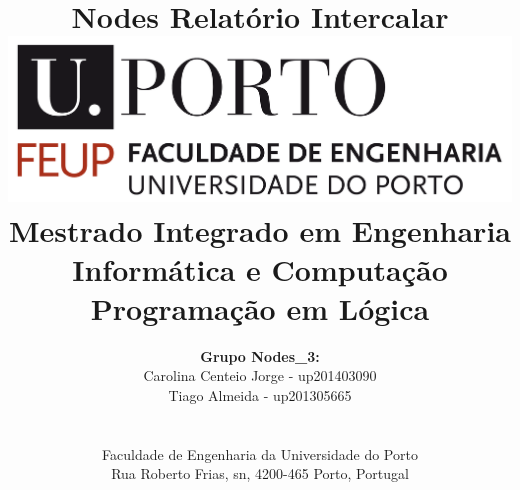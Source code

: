 \documentclass[a4paper]{article}
\begin{document}
\renewcommand{\figurename}{Fig.}

\setlength{\textwidth}{16cm}
\setlength{\textheight}{22cm}

\title{\Huge\textbf{Nodes}\linebreak\linebreak\linebreak
\Large\textbf{Relatório Intercalar}\linebreak\linebreak
\linebreak\linebreak
\includegraphics[scale=0.1]{feup-logo.png}\linebreak\linebreak
\linebreak\linebreak
\Large{Mestrado Integrado em Engenharia Informática e Computação} \linebreak\linebreak
\Large{Programação em Lógica}\linebreak
}

\author{\textbf{Grupo Nodes\_3:}\\
Carolina Centeio Jorge - up201403090 \\
Tiago Almeida - up201305665 \\
\linebreak\linebreak \\
 \\ Faculdade de Engenharia da Universidade do Porto \\ Rua Roberto Frias, s\/n, 4200-465 Porto, Portugal \linebreak\linebreak\linebreak
\linebreak\linebreak\vspace{1cm}}

\maketitle
\thispagestyle{empty}
\end{document}
